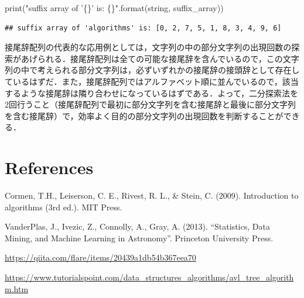 \documentclass[
]{ltjarticle}
\newenvironment{Shaded}{\begin{snugshade}}{\end{snugshade}}
\newcommand{\BuiltInTok}[1]{#1}
\newcommand{\NormalTok}[1]{#1}
\newcommand{\SpecialCharTok}[1]{\textcolor[rgb]{0.00,0.00,0.00}{#1}}
\newcommand{\StringTok}[1]{\textcolor[rgb]{0.31,0.60,0.02}{#1}}
\begin{document}
\begin{Shaded}
\begin{Highlighting}[]
\BuiltInTok{print}\NormalTok{(}\StringTok{"suffix array of '}\SpecialCharTok{\{\}}\StringTok{' is: }\SpecialCharTok{\{\}}\StringTok{"}\NormalTok{.}\BuiltInTok{format}\NormalTok{(string, suffix_array))}
\end{Highlighting}
\end{Shaded}

\begin{verbatim}
## suffix array of 'algorithms' is: [0, 2, 7, 5, 1, 8, 3, 4, 9, 6]
\end{verbatim}

接尾辞配列の代表的な応用例としては，文字列の中の部分文字列の出現回数の探索があげられる．接尾辞配列は全ての可能な接尾辞を含んでいるので，この文字列の中で考えられる部分文字列は，必ずいずれかの接尾辞の接頭辞として存在しているはずだ．また，接尾辞配列ではアルファベット順に並んでいるので，該当するような接尾辞は隣り合わせになっているはずである．よって，二分探索法を2回行うこと（接尾辞配列で最初に部分文字列を含む接尾辞と最後に部分文字列を含む接尾辞）で，効率よく目的の部分文字列の出現回数を判断することができる．

\hypertarget{references}{%
\section{References}\label{references}}

\setlength{\parindent}{-0.2in}
\setlength{\leftskip}{0.2in}
\setlength{\parskip}{8pt}

\noindent

Cormen, T.H., Leiserson, C. E., Rivest, R. L., \& Stein, C. (2009).
Introduction to algorithms (3rd ed.). MIT Press.

VanderPlas, J., Ivezic, Z., Connolly, A., Gray, A. (2013). ``Statistics,
Data Mining, and Machine Learning in Astronomy''. Princeton University
Press.

\url{https://qiita.com/flare/items/20439a1db54b367eea70}

\url{https://www.tutorialspoint.com/data_structures_algorithms/avl_tree_algorithm.htm}
\end{document}
